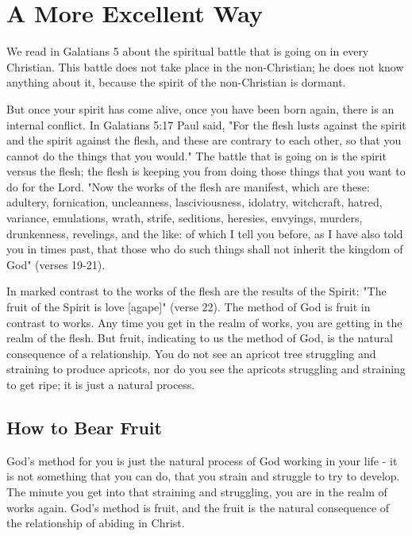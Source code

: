 \chapter{A More Excellent Way}

We read in Galatians 5 about the spiritual battle that is going on in every Christian. This battle does not take place in the non-Christian; he does not know anything about it, because the spirit of the non-Christian is dormant. 

But once your spirit has come alive, once you have been born again, there is an internal conflict. In Galatians 5:17 Paul said, "For the flesh lusts against the spirit and the spirit against the flesh, and these are contrary to each other, so that you cannot do the things that you would." The battle that is going on is the spirit versus the flesh; the flesh is keeping you from doing those things that you want to do for the Lord. "Now the works of the flesh are manifest, which are these: adultery, fornication, uncleanness, lasciviousness, idolatry, witchcraft, hatred, variance, emulations, wrath, strife, seditions, heresies, envyings, murders, drunkenness, revelings, and the like: of which I tell you before, as I have also told you in times past, that those who do such things shall not inherit the kingdom of God" (verses 19-21). 

In marked contrast to the works of the flesh are the results of the Spirit: "The fruit of the Spirit is love [agape]" (verse 22). The method of God is fruit in contrast to works. Any time you get in the realm of works, you are getting in the realm of the flesh. But fruit, indicating to us the method of God, is the natural consequence of a relationship. You do not see an apricot tree struggling and straining to produce apricots, nor do you see the apricots struggling and straining to get ripe; it is just a natural process. 

\section*{How to Bear Fruit}

God's method for you is just the natural process of God working in your life - it is not something that you can do, that you strain and struggle to try to develop. The minute you get into that straining and struggling, you are in the realm of works again. God's method is fruit, and the fruit is the natural consequence of the relationship of abiding in Christ. 

